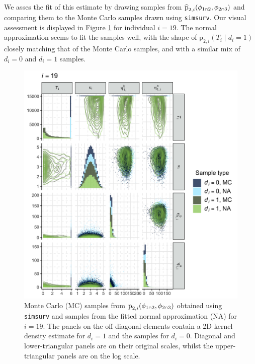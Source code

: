 \documentclass[
  10pt,
  a4paper,
]{article}
\let\Oldcap\cap
\renewcommand{\cap}{\mathrel{\mathsmaller{\Oldcap}}}
\newcommand{\pd}{\text{p}}
\begin{document}
We asses the fit of this estimate by drawing samples from
\(\widehat{\pd}_{2, i}(\phi_{1 \cap 2}, \phi_{2 \cap 3})\) and comparing
them to the Monte Carlo samples drawn using \texttt{simsurv}. Our visual
assessment is displayed in Figure \ref{fig:surv_prior_plot_fit} for
individual \(i = 19\). The normal approximation seems to fit the samples
well, with the shape of \(\pd_{2, i}(T_{i} \mid d_{i} = 1)\) closely
matching that of the Monte Carlo samples, and with a similar mix of
\(d_{i} = 0\) and \(d_{i} = 1\) samples.

\begin{figure}

{\centering \includegraphics{../plots/mimic-example/p3-prior-pairs/pairs-19} 

}

\caption{Monte Carlo (MC) samples from $\pd_{2, i}(\phi_{1 \cap 2}, \phi_{2 \cap 3})$ obtained using \texttt{simsurv} and samples from the fitted normal approximation (NA) for $i = 19$. The panels on the off diagonal elements contain a 2D kernel density estimate for $d_{i} = 1$ and the samples for $d_{i} = 0$. Diagonal and lower-triangular panels are on their original scales, whilst the upper-triangular panels are on the log scale.}\label{fig:surv_prior_plot_fit}
\end{figure}
\end{document}
